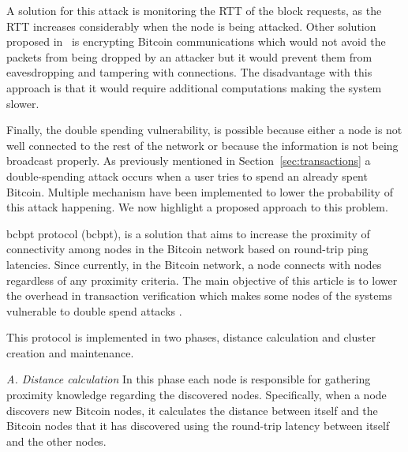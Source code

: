 A solution for this attack is monitoring the RTT of the block requests, as the RTT increases considerably when the node is being attacked. Other solution proposed in~\cite{apostolaki2016hijacking} is encrypting Bitcoin communications which would not avoid the packets from being dropped by an attacker but it would prevent them from eavesdropping and tampering with connections. The disadvantage with this approach is that it would require additional computations making the system slower.


Finally, the double spending vulnerability, is possible because either a node is not well connected to the rest of the network or because the information is not being broadcast properly. As previously mentioned in Section~\ref{sec:transactions} a double-spending attack occurs when a user tries to spend an already spent Bitcoin. Multiple mechanism have been implemented to lower the probability of this attack happening. We now highlight a proposed approach to this problem.

\acrlong{bcbpt} protocol (\acrshort{bcbpt}), is a solution that aims to increase the proximity of connectivity among nodes in the Bitcoin network based on round-trip ping latencies. Since currently, in the Bitcoin network, a node connects with nodes regardless of any proximity criteria. The main objective of this article is to lower the overhead in transaction verification which makes some nodes of the systems vulnerable to double spend attacks \cite{owenson2017proximity}.

This protocol is implemented in two phases, distance calculation and cluster creation and maintenance. 

\textsl{A. Distance calculation} In this phase each node is responsible for gathering proximity knowledge regarding the discovered nodes. Specifically, when a node discovers new Bitcoin nodes, it calculates the distance between itself and the Bitcoin nodes that it has discovered using the round-trip latency between itself and the other nodes. 

